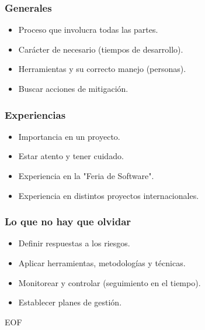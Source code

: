 \frame
{
\frametitle{Generales}
\begin{itemize}
	\item Proceso que involucra todas las partes.
	\item Carácter de necesario (tiempos de desarrollo).
	\item Herramientas y su correcto manejo (personas).
	\item Buscar acciones de mitigación.
\end{itemize}
}

\frame
{
\frametitle{Experiencias}
\begin{itemize}
	\item Importancia en un proyecto.
	\item Estar atento y tener cuidado.
	\item Experiencia en la "Feria de Software".
	\item Experiencia en distintos proyectos internacionales.
\end{itemize}
}

\frame
{
\frametitle{Lo que no hay que olvidar}
\begin{itemize}
	\item Definir respuestas a los riesgos.
	\item Aplicar herramientas, metodologías y técnicas.
	\item Monitorear y controlar (seguimiento en el tiempo).
	\item Establecer planes de gestión.
\end{itemize}
}

\frame
{
	\vspace{2cm}
	\begin{center}
		\Large{EOF}
	\end{center}
}
